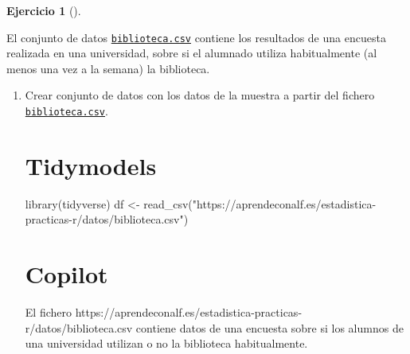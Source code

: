 \documentclass[
  a4paper,
]{scrreport}
\newenvironment{Shaded}{\begin{snugshade}}{\end{snugshade}}
\newcommand{\ExtensionTok}[1]{\textcolor[rgb]{0.00,0.23,0.31}{#1}}
\newcommand{\FunctionTok}[1]{\textcolor[rgb]{0.28,0.35,0.67}{#1}}
\newcommand{\NormalTok}[1]{\textcolor[rgb]{0.00,0.23,0.31}{#1}}
\newcommand{\OtherTok}[1]{\textcolor[rgb]{0.00,0.23,0.31}{#1}}
\newcommand{\StringTok}[1]{\textcolor[rgb]{0.13,0.47,0.30}{#1}}
\theoremstyle{definition}
\newtheorem{exercise}{Ejercicio}[chapter]
\theoremstyle{remark}
\begin{document}
\begin{exercise}[]\protect\hypertarget{exr-intervalo-comparacion-proporciones-uso-biblioteca}{}\label{exr-intervalo-comparacion-proporciones-uso-biblioteca}

El conjunto de datos
\href{https://aprendeconalf.es/estadistica-practicas-r/datos/biblioteca.csv}{\texttt{biblioteca.csv}}
contiene los resultados de una encuesta realizada en una universidad,
sobre si el alumnado utiliza habitualmente (al menos una vez a la
semana) la biblioteca.

\begin{enumerate}
\def\labelenumi{\alph{enumi}.}
\item
  Crear conjunto de datos con los datos de la muestra a partir del
  fichero
  \href{https://aprendeconalf.es/estadistica-practicas-r/datos/biblioteca.csv}{\texttt{biblioteca.csv}}.

  \begin{tcolorbox}[enhanced jigsaw, colframe=quarto-callout-tip-color-frame, toprule=.15mm, bottomtitle=1mm, breakable, opacitybacktitle=0.6, toptitle=1mm, colback=white, bottomrule=.15mm, title=\textcolor{quarto-callout-tip-color}{\faLightbulb}\hspace{0.5em}{Solución}, arc=.35mm, left=2mm, titlerule=0mm, rightrule=.15mm, coltitle=black, leftrule=.75mm, opacityback=0, colbacktitle=quarto-callout-tip-color!10!white]

  \section{Tidymodels}

\begin{Shaded}
\begin{Highlighting}[]
\FunctionTok{library}\NormalTok{(tidyverse)}
\NormalTok{df }\OtherTok{\textless{}{-}} \FunctionTok{read\_csv}\NormalTok{(}\StringTok{"https://aprendeconalf.es/estadistica{-}practicas{-}r/datos/biblioteca.csv"}\NormalTok{)}
\end{Highlighting}
\end{Shaded}

  \section{Copilot}

\begin{Shaded}
\begin{Highlighting}[]
\ExtensionTok{El}\NormalTok{ fichero https://aprendeconalf.es/estadistica{-}practicas{-}r/datos/biblioteca.csv contiene datos de una encuesta sobre si los alumnos de una universidad utilizan o no la biblioteca habitualmente.}


\end{Highlighting}
\end{Shaded}
\end{tcolorbox}
\end{enumerate}
\end{exercise}
\end{document}
